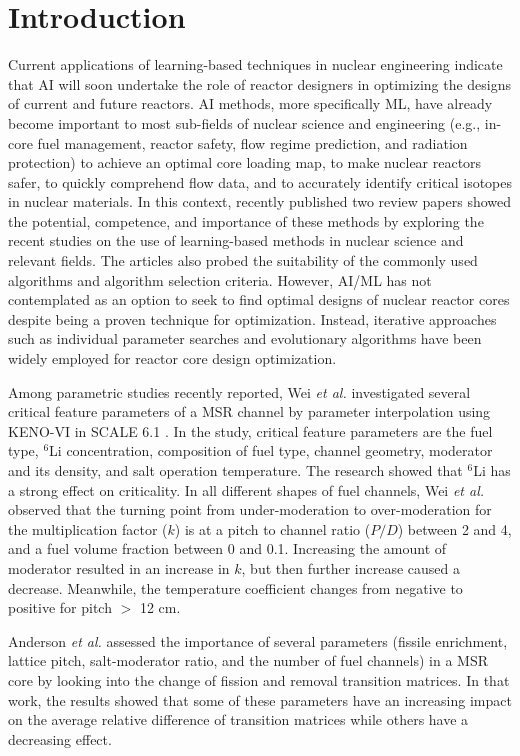 \section{Introduction}

    Current applications of learning-based techniques in nuclear engineering indicate that \gls{AI} will soon undertake the role of reactor designers in optimizing the designs of current and future reactors. \gls{AI} methods, more specifically \gls{ML}, have already become important to most sub-fields of nuclear science and engineering (e.g., in-core fuel management, reactor safety, flow regime prediction, and radiation protection) to achieve an optimal core loading map, to make nuclear reactors safer, to quickly comprehend flow data, and to accurately identify critical isotopes in nuclear materials. In this context, recently published two review papers \cite{Gomez2020, Nissan2019} showed the potential, competence, and importance of these methods by exploring the recent studies on the use of learning-based methods in nuclear science and relevant fields. The articles also probed the suitability of the commonly used algorithms and algorithm selection criteria. However, \gls{AI}/\gls{ML} has not contemplated as an option to seek to find optimal designs of nuclear reactor cores despite being a proven technique for optimization. Instead, iterative approaches such as individual parameter searches and evolutionary algorithms have been widely employed for reactor core design optimization.

    Among parametric studies recently reported, Wei \emph{et al.} \cite{Wei2018} investigated several critical feature parameters of a \gls{MSR} channel by parameter interpolation using KENO-VI in SCALE 6.1 \cite{scale2020}. In the study, critical feature parameters are the fuel type, $^{6}$Li concentration, composition of fuel type, channel geometry, moderator and its density, and salt operation temperature. The research showed that $^{6}$Li has a strong effect on criticality. In all different shapes of fuel channels, Wei \emph{et al.} \cite{Wei2018} observed that the turning point from under-moderation to over-moderation for the multiplication factor ($k$) is at a pitch to channel ratio ($P/D$) between 2 and 4, and a fuel volume fraction between 0 and 0.1. Increasing the amount of moderator resulted in an increase in $k$, but then further increase caused a decrease. Meanwhile, the temperature coefficient changes from negative to positive for pitch $>$ 12 cm.

    Anderson \emph{et al.} \cite{Anderson2019} assessed the importance of several parameters (fissile enrichment, lattice pitch, salt-moderator ratio, and the number of fuel channels) in a \gls{MSR} core by looking into the change of fission and removal transition matrices. In that work, the results showed that some of these parameters have an increasing impact on the average relative difference of transition matrices while others have a decreasing effect.

